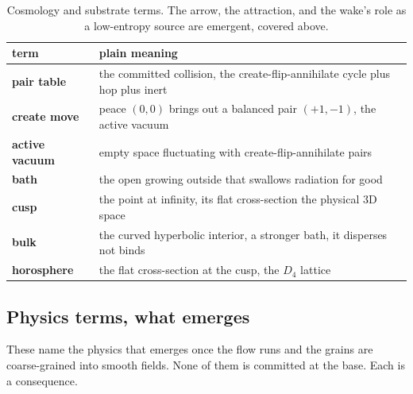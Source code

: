 \begin{table}[ht]
\centering
\begin{tabular}{@{}ll@{}}
\toprule
term & plain meaning \\
\midrule
\textbf{pair table} & the committed collision, the create-flip-annihilate cycle plus hop plus inert \\
\textbf{create move} & peace $(0,0)$ brings out a balanced pair $(+1,-1)$, the active vacuum \\
\textbf{active vacuum} & empty space fluctuating with create-flip-annihilate pairs \\
\textbf{bath} & the open growing outside that swallows radiation for good \\
\textbf{cusp} & the point at infinity, its flat cross-section the physical $3$D space \\
\textbf{bulk} & the curved hyperbolic interior, a stronger bath, it disperses not binds \\
\textbf{horosphere} & the flat cross-section at the cusp, the $D_4$ lattice \\
\bottomrule
\end{tabular}
\caption{Cosmology and substrate terms. The arrow, the attraction, and the wake's role as a low-entropy source are emergent, covered above.}
\label{tab:cosmology}
\end{table}

\subsection{Physics terms, what emerges}

These name the physics that emerges once the flow runs and the grains are coarse-grained into smooth fields. None of them is committed at the base. Each is a consequence.

